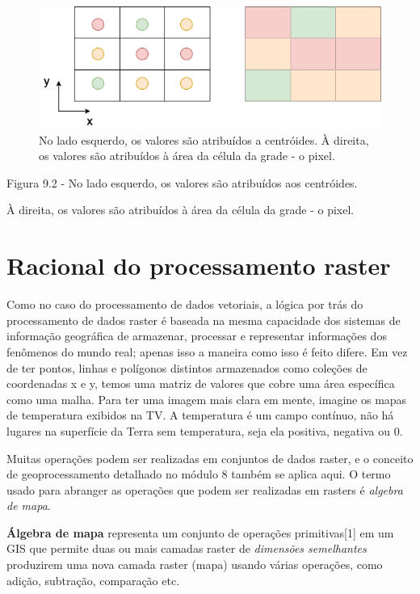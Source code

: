 \documentclass[
]{krantz}
\begin{document}
\begin{figure}
\centering
\includegraphics{media/modulo9/fig92.png}
\caption{No lado esquerdo, os valores são atribuídos a centróides. À direita, os valores são atribuídos à área da célula da grade - o pixel.}
\end{figure}

Figura 9.2 - No lado esquerdo, os valores são atribuídos aos centróides.

À direita, os valores são atribuídos à área da célula da grade - o pixel.

\hypertarget{racional-do-processamento-raster}{%
\section{Racional do processamento raster}\label{racional-do-processamento-raster}}

Como no caso do processamento de dados vetoriais, a lógica por trás do processamento de dados raster é baseada na mesma capacidade dos sistemas de informação geográfica de armazenar, processar e representar informações dos fenômenos do mundo real; apenas isso a maneira como isso é feito difere. Em vez de ter pontos, linhas e polígonos distintos armazenados como coleções de coordenadas x e y, temos uma matriz de valores que cobre uma área específica como uma malha. Para ter uma imagem mais clara em mente, imagine os mapas de temperatura exibidos na TV. A temperatura é um campo contínuo, não há lugares na superfície da Terra sem temperatura, seja ela positiva, negativa ou 0.

Muitas operações podem ser realizadas em conjuntos de dados raster, e o conceito de geoprocessamento detalhado no módulo 8 também se aplica aqui. O termo usado para abranger as operações que podem ser realizadas em rasters é \emph{algebra de mapa}.

\textbf{Álgebra de mapa} representa um conjunto de operações primitivas{[}1{]} em um GIS que permite duas ou mais camadas raster de \emph{dimensões semelhantes} produzirem uma nova camada raster (mapa) usando várias operações, como adição, subtração, comparação etc.
\end{document}
